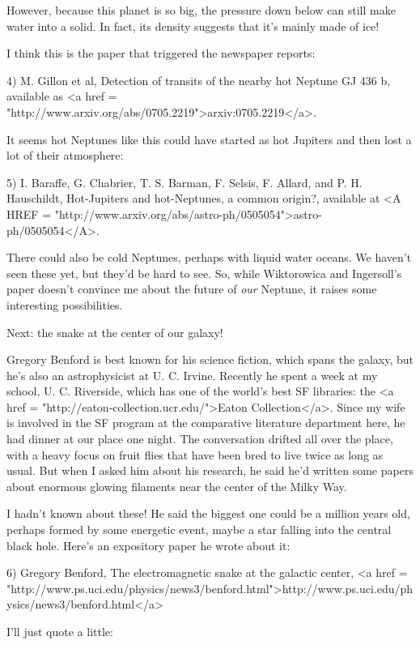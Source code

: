 However, because this planet is so big, the pressure down below can
still make water into a solid.  In fact, its density suggests that
it's mainly made of ice!

I think this is the paper that triggered the newspaper reports:

4) M. Gillon et al, Detection of transits of the nearby hot Neptune 
GJ 436 b, available as <a href = "http://www.arxiv.org/abs/0705.2219">arxiv:0705.2219</a>.

It seems hot Neptunes like this could have started as hot Jupiters 
and then lost a lot of their atmosphere:  

5) I. Baraffe, G. Chabrier, T. S. Barman, F. Selsis, F. Allard, 
and P. H. Hauschildt, Hot-Jupiters and hot-Neptunes, a common origin?,
available at <A HREF = "http://www.arxiv.org/abs/astro-ph/0505054">astro-ph/0505054</A>.

There could also be cold Neptunes, perhaps with liquid water oceans.
We haven't seen these yet, but they'd be hard to see.  So, while 
Wiktorowica and Ingersoll's paper doesn't convince me about the future 
of \emph{our} Neptune, it raises some interesting possibilities.

Next: the snake at the center of our galaxy! 

Gregory Benford is best known for his science fiction, which spans
the galaxy, but he's also an astrophysicist at U. C. Irvine.  Recently
he spent a week at my school, U. C. Riverside, which has one of the 
world's best SF libraries: the <a href = "http://eaton-collection.ucr.edu/">Eaton Collection</a>.  Since my wife is
involved in the SF program at the comparative literature department here,
he had dinner at our place one night.  The conversation drifted all over 
the place, with a heavy focus on fruit flies that have been bred to live
twice as long as usual.  But when I asked him about his research, he 
said he'd written some papers about enormous glowing filaments near 
the center of the Milky Way. 

I hadn't known about these!  He said the biggest one could be a million 
years old, perhaps formed by some energetic event, maybe a star falling 
into the central black hole.  Here's an expository paper he wrote about
it:

6) Gregory Benford, The electromagnetic snake at the galactic center,
<a href = "http://www.ps.uci.edu/physics/news3/benford.html">http://www.ps.uci.edu/physics/news3/benford.html</a>

I'll just quote a little:

